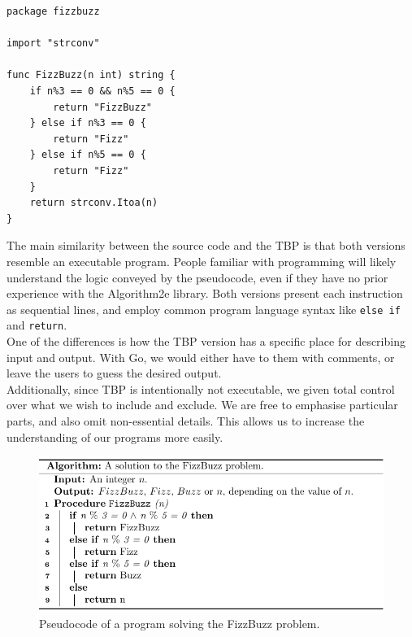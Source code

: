 \begin{lstlisting}[caption={A Go program solving the FizzBuzz problem.}, captionpos=b, label={FizzBuzzGo}]
package fizzbuzz

import "strconv"

func FizzBuzz(n int) string {
    if n%3 == 0 && n%5 == 0 {
        return "FizzBuzz"
    } else if n%3 == 0 {
        return "Fizz"
    } else if n%5 == 0 {
        return "Fizz"
    }
    return strconv.Itoa(n)
}
\end{lstlisting}

The main similarity between the source code and the TBP is that both versions resemble an executable program. People familiar with programming will likely understand the logic conveyed by the pseudocode, even if they have no prior experience with the Algorithm2e library. Both versions present each instruction as sequential lines, and employ common program language syntax like \texttt{else if} and \texttt{return}. \\

One of the differences is how the TBP version has a specific place for describing input and output. With Go, we would either have to them with comments, or leave the users to guess the desired output. \\

Additionally, since TBP is intentionally not executable, we given total control over what we wish to include and exclude. We are free to emphasise particular parts, and also omit non-essential details. This allows us to increase the understanding of our programs more easily. \\

\begin{figure}[ht]
    \centering
    \includegraphics[scale=.95]{assets/chapter3/FizzBuzzAlgorithm2e.pdf}
    \caption{Pseudocode of a program solving the FizzBuzz problem.}
    \label{FizzBuzz with Algorithm2e.}
\end{figure}

